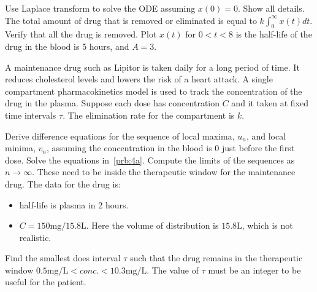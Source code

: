 \documentclass[
	number={4},
	title={Pharmacokinetics}
]{math486homework}
\begin{document}
\begin{problems}
\begin{problems}
		\subproblem Use Laplace transform to solve the ODE assuming $x(0) = 0$.
		Show all details.
		\subproblem The total amount of drug that is removed or eliminated is equal to $k \int_{0}^{\infty} x(t)dt $.
		Verify that all the drug is removed. 
		\subproblem Plot $x(t)$ for $0 < t < 8$ is the half-life of the drug in the blood is 5 hours, and $A=3$. 
	\end{problems}
	\problem A maintenance drug such as Lipitor is taken daily for a long period of time.
	It reduces cholesterol levels and lowers the risk of a heart attack.
	A single compartment pharmacokinetics model is used to track the concentration of the drug in the plasma.
	Suppose each dose has concentration $C$ and it taken at fixed time intervals $\tau$.
	The elimination rate for the compartment is $k$.
	\begin{problems}
		\subproblem Derive difference equations for the sequence of local maxima, $u_{n}$, and local minima, $v_{n}$, assuming the concentration in the blood is 0 just before the first dose. 
		\subproblem Solve the equations in~\ref{prb:4a}.
		Compute the limits of the sequences as $n\rightarrow\infty$.
		These need to be inside the therapeutic window for the maintenance drug. 
		\subproblem The data for the drug is:
		\begin{itemize}
			\item half-life is plasma in 2 hours.
			\item $C = 150 \mbox{mg} / 15.8 \mbox{L}$.
			Here the volume of distribution is $15.8\mbox{L}$, which is not realistic.
		\end{itemize}
		Find the smallest does interval $\tau$ such that the drug remains in the therapeutic window  $0.5 \mbox{mg} / \mbox{L} < conc. < 10.3 \mbox{mg} / \mbox{L}$.
		The value of $\tau$ must be an integer to be useful for the patient.
	\end{problems}
\end{problems}
\end{document}
